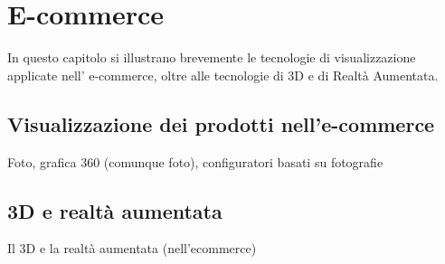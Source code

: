 \chapter{E-commerce}
\label{chap:ecommerce}
In questo capitolo si illustrano brevemente le tecnologie di visualizzazione applicate nell' e-commerce, oltre alle tecnologie di 3D e di Realtà Aumentata.

\section{Visualizzazione dei prodotti nell'e-commerce}
Foto, grafica 360 (comunque foto), configuratori basati su fotografie

\section{3D e realtà aumentata}
Il 3D e la realtà aumentata (nell'ecommerce)